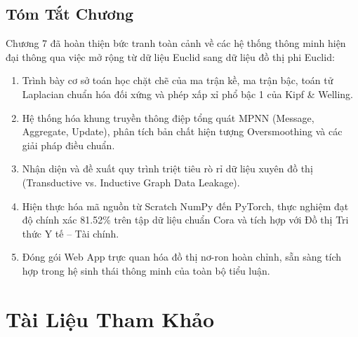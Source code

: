 \documentclass[12pt,a4paper]{report}
\begin{document}
\section{Tóm Tắt Chương}
Chương 7 đã hoàn thiện bức tranh toàn cảnh về các hệ thống thông minh hiện đại thông qua việc mở rộng từ dữ liệu Euclid sang dữ liệu đồ thị phi Euclid:
\begin{enumerate}[leftmargin=1.2cm]
    \item Trình bày cơ sở toán học chặt chẽ của ma trận kề, ma trận bậc, toán tử Laplacian chuẩn hóa đối xứng và phép xấp xỉ phổ bậc 1 của Kipf \& Welling.
    \item Hệ thống hóa khung truyền thông điệp tổng quát MPNN (Message, Aggregate, Update), phân tích bản chất hiện tượng Oversmoothing và các giải pháp điều chuẩn.
    \item Nhận diện và đề xuất quy trình triệt tiêu rò rỉ dữ liệu xuyên đồ thị (Transductive vs. Inductive Graph Data Leakage).
    \item Hiện thực hóa mã nguồn từ Scratch NumPy đến PyTorch, thực nghiệm đạt độ chính xác 81.52\% trên tập dữ liệu chuẩn Cora và tích hợp với Đồ thị Tri thức Y tế -- Tài chính.
    \item Đóng gói Web App trực quan hóa đồ thị nơ-ron hoàn chỉnh, sẵn sàng tích hợp trong hệ sinh thái thông minh của toàn bộ tiểu luận.
\end{enumerate}



\chapter*{Tài Liệu Tham Khảo}
\end{document}

